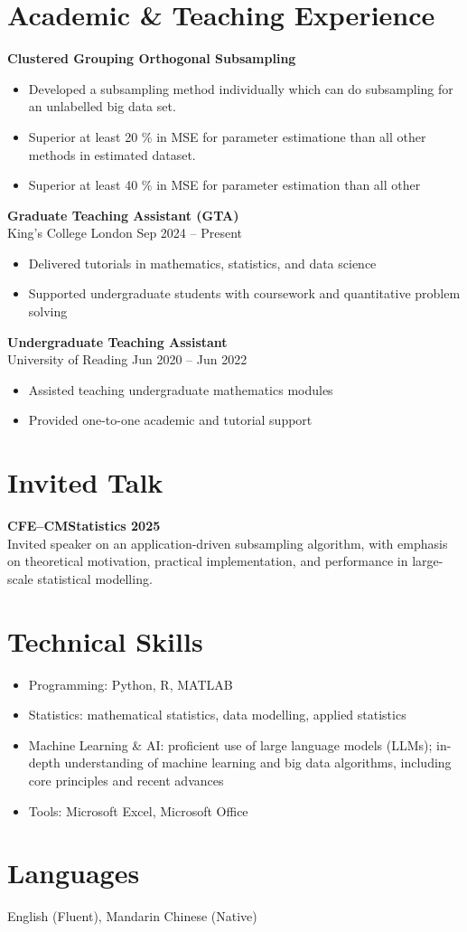 \documentclass[11pt,a4paper]{article}
\begin{document}
\section*{Academic \& Teaching Experience}
\quad \textbf{Clustered Grouping Orthogonal Subsampling} \\
\begin{itemize}
\item Developed a subsampling method individually which can do subsampling for an unlabelled big data set.
\item Superior at least 20 $\%$ in MSE for parameter estimatione than all other methods in estimated dataset.
\item Superior at least 40 $\%$ in MSE for parameter estimation than all other 
\end{itemize}
\quad \textbf{Graduate Teaching Assistant (GTA)} \\
King’s College London \hfill Sep 2024 -- Present
\begin{itemize}
\item Delivered tutorials in mathematics, statistics, and data science
\item Supported undergraduate students with coursework and quantitative problem solving
\end{itemize}

\textbf{Undergraduate Teaching Assistant} \\
University of Reading \hfill Jun 2020 -- Jun 2022
\begin{itemize}
\item Assisted teaching undergraduate mathematics modules
\item Provided one-to-one academic and tutorial support
\end{itemize}

\section*{Invited Talk}

\textbf{CFE--CMStatistics 2025} \\
Invited speaker on an application-driven subsampling algorithm, with emphasis on theoretical motivation,
practical implementation, and performance in large-scale statistical modelling.

\section*{Technical Skills}
\begin{itemize}
\item Programming: Python, R, MATLAB
\item Statistics: mathematical statistics, data modelling, applied statistics
\item Machine Learning \& AI: proficient use of large language models (LLMs); in-depth understanding of machine learning and big data algorithms, including core principles and recent advances
\item Tools: Microsoft Excel, Microsoft Office
\end{itemize}

\section*{Languages}
English (Fluent), Mandarin Chinese (Native)
\end{document}

